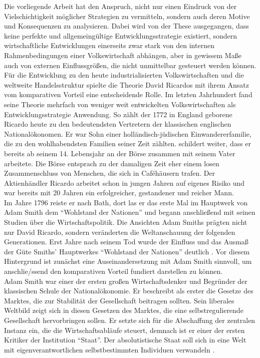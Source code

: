 %
Die vorliegende Arbeit hat den Anspruch, nicht nur einen Eindruck von der Vielschichtigkeit möglicher Strategien zu vermitteln, sondern auch deren Motive und Konsequenzen zu analysieren. Dabei wird von der These ausgegangen, dass keine perfekte und allgemeingültige Entwicklungsstrategie existiert, sondern wirtschaftliche Entwicklungen einerseits zwar stark von den internen Rahmenbedingungen einer Volkswirtschaft abhängen, aber in gewissem Maße auch von externen Einflussgrößen, die nicht unmittelbar gesteuert werden können.\\
%
Für die Entwicklung zu den heute industrialisierten Volkswirtschaften und die weltweite Handelsstruktur spielte die Theorie David Ricardos mit ihrem Ansatz vom komparativen Vorteil eine entscheidende Rolle. Im letzten Jahrhundert fand seine Theorie mehrfach von weniger weit entwickelten Volkswirtschaften als Entwicklungsstrategie Anwendung. So zählt  der 1772 in England geborene Ricardo heute zu den bedeutendsten Vertretern der klassischen englischen Nationalökonomen. Er war Sohn einer holländisch-jüdischen Einwandererfamilie, die zu den wohlhabendsten Familien seiner Zeit zählten. \cite{Lin.2007} schildert weiter, dass er bereits ab seinem 14. Lebensjahr an der Börse zusammen mit seinem Vater arbeitete. Die Börse entsprach zu der damaligen Zeit eher einem losen Zusammenschluss von Menschen, die sich in Caféhäusern trafen. Der Aktienhändler Ricardo arbeitet schon in jungen Jahren auf eigenes Risiko und war bereits mit 20 Jahren ein erfolgreicher, gestandener und reicher Mann. \\
%
Im Jahre 1796 reiste er nach Bath, dort las er das erste Mal im Hauptwerk von Adam Smith dem "`Wohlstand der Nationen"' und begann anschließend mit seinen Studien über die Wirtschaftspolitik. Die Ansichten Adam Smiths prägten nicht nur David Ricardo, sondern veränderten die Weltanschauung der folgenden Generationen. Erst Jahre nach seinem Tod wurde der Einfluss und das Ausmaß der Güte Smiths' Hauptwerkes "`Wohlstand der Nationen"' deutlich \cite[S. 24]{Lin.2007}. Vor diesem Hintergrund ist zunächst eine Auseinandersetzung mit Adam Smith sinnvoll, um anschlie{/ss}end den komparativen Vorteil fundiert darstellen zu können.\\
%
Adam Smith war einer der ersten großen Wirtschaftsdenker und Begründer der klassischen Schule der Nationalökonomie. Er beschreibt als erster die Gesetze des Marktes, die zur Stabilität der Gesellschaft beitragen sollten.  Sein liberales Weltbild zeigt sich in diesen Gesetzen des Marktes, die eine selbstregulierende Gesellschaft hervorbringen sollen. Er setzte sich für die Abschaffung der zentralen Instanz ein, die die Wirtschaftsabläufe steuert, demnach ist er einer der ersten Kritiker der Institution "`Staat"'. Der absolutistische Staat soll sich in eine Welt mit eigenverantwortlichen selbstbestimmten Individuen verwandeln \cite[S.25]{Huther.2006,Lin.2007}.\\
